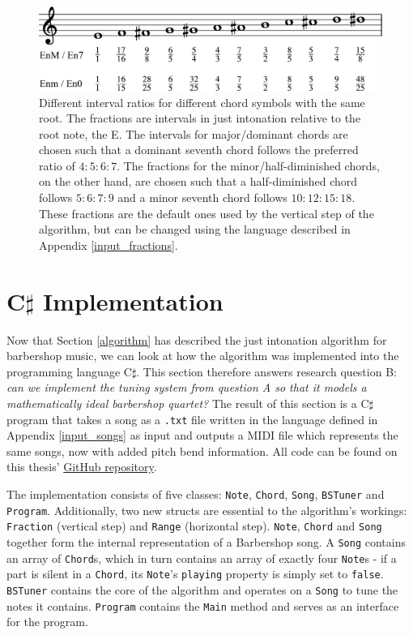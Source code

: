\documentclass[a4paper]{article}
\begin{document}
\begin{figure}
	\centering
	\includegraphics[width=\textwidth]{Figures/fractions.pdf}
	\caption{Different interval ratios for different chord symbols with the same root. The fractions are intervals in just intonation relative to the root note, the E. The intervals for major/dominant chords are chosen such that a dominant seventh chord follows the preferred ratio of $4:5:6:7$. \cite{van_de_craats_fis_1989} The fractions for the minor/half-diminished chords, on the other hand, are chosen such that a half-diminished chord follows $5:6:7:9$ and a minor seventh chord follows $10:12:15:18$. \cite{van_de_craats_fis_1989} These fractions are the default ones used by the vertical step of the algorithm, but can be changed using the language described in Appendix \ref{input_fractions}.}
	\label{fig:fractions}
\end{figure}

\section{C$\sharp$ Implementation}
\label{implementation}
Now that Section \ref{algorithm} has described the just intonation algorithm for barbershop music, we can look at how the algorithm was implemented into the programming language C$\sharp$. This section therefore answers research question B: {\it can we implement the tuning system from question A so that it models a mathematically ideal barbershop quartet?} The result of this section is a C$\sharp$ program that takes a song as a \texttt{.txt} file written in the language defined in Appendix \ref{input_songs} as input and outputs a MIDI file which represents the same songs, now with added pitch bend information. All code can be found on this thesis' \href{https://GitHub.com/teuncb/AdaptiveBarbershop}{GitHub repository}.

The implementation consists of five classes: \texttt{Note}, \texttt{Chord}, \texttt{Song}, \texttt{BSTuner} and \texttt{Program}. Additionally, two new structs are essential to the algorithm's workings: \texttt{Fraction} (vertical step) and \texttt{Range} (horizontal step). \texttt{Note}, \texttt{Chord} and \texttt{Song} together form the internal representation of a Barbershop song. A \texttt{Song} contains an array of \texttt{Chord}s, which in turn contains an array of exactly four \texttt{Note}s - if a part is silent in a \texttt{Chord}, its \texttt{Note}'s \texttt{playing} property is simply set to \texttt{false}. \texttt{BSTuner} contains the core of the algorithm and operates on a \texttt{Song} to tune the notes it contains. \texttt{Program} contains the \texttt{Main} method and serves as an interface for the program.
\end{document}
